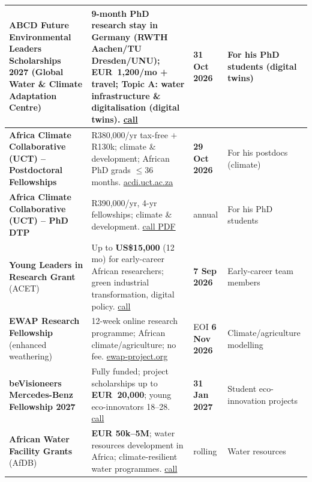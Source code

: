 \documentclass[11pt,a4paper]{article}
\begin{document}
\begin{longtable}{@{}p{3.3cm}p{5.6cm}p{2.2cm}p{2.8cm}@{}}
\midrule
\textbf{ABCD Future Environmental Leaders Scholarships 2027} (Global Water \& Climate Adaptation Centre) & 9-month PhD research stay in Germany (RWTH Aachen/TU Dresden/UNU); EUR~1{,}200/mo + travel; \textbf{Topic A: water infrastructure \& digitalisation (digital twins)}. \href{https://opportunityforafrica.org/blog/apply-for-the-abcd-future-environmental-leaders-scholarships-2027-9-month-phd-research-stay-in-germany-for-global-south-scholars/}{call} & \textbf{31 Oct 2026} & For his PhD students (digital twins) \\
\midrule
\textbf{Africa Climate Collaborative (UCT) -- Postdoctoral Fellowships} & R380{,}000/yr tax-free $+$ R130k; climate \& development; African PhD grads $\leq$36 months. \href{https://acdi.uct.ac.za/africaclimatecollaborative/postdoctoral-research-fellowships-climate-and-development}{acdi.uct.ac.za} & \textbf{29 Oct 2026} & For his postdocs (climate) \\
\midrule
\textbf{Africa Climate Collaborative (UCT) -- PhD DTP} & R390{,}000/yr, 4-yr fellowships; climate \& development. \href{https://acdi.uct.ac.za/sites/default/files/media/documents/acdi_uct_ac_za/1205/africa-climate-collaborative-phd-topic-call.pdf}{call PDF} & annual & For his PhD students \\
\midrule
\textbf{Young Leaders in Research Grant} (ACET) & Up to \textbf{US\$15{,}000} (12 mo) for early-career African researchers; green industrial transformation, digital policy. \href{https://www2.fundsforngos.org/leadership/young-leaders-in-research-grant-for-early-career-african-researchers/}{call} & \textbf{7 Sep 2026} & Early-career team members \\
\midrule
\textbf{EWAP Research Fellowship} (enhanced weathering) & 12-week online research programme; African climate/agriculture; no fee. \href{https://ewap-project.org/fellowship}{ewap-project.org} & EOI \textbf{6 Nov 2026} & Climate/agriculture modelling \\
\midrule
\textbf{beVisioneers Mercedes-Benz Fellowship 2027} & Fully funded; project scholarships up to \textbf{EUR~20{,}000}; young eco-innovators 18--28. \href{https://opportunitypool.org/apply-for-the-bevisioneers-mercedes-benz-fellowship-2027fully-funded/}{call} & \textbf{31 Jan 2027} & Student eco-innovation projects \\
\midrule
\textbf{African Water Facility Grants} (AfDB) & \textbf{EUR 50k--5M}; water resources development in Africa; climate-resilient water programmes. \href{https://www.fundsforngos.org/latest-funds-for-ngos/the-african-water-facility-grants-on-water-and-climate-change/}{call} & rolling & Water resources \\

\end{longtable}
\end{document}
